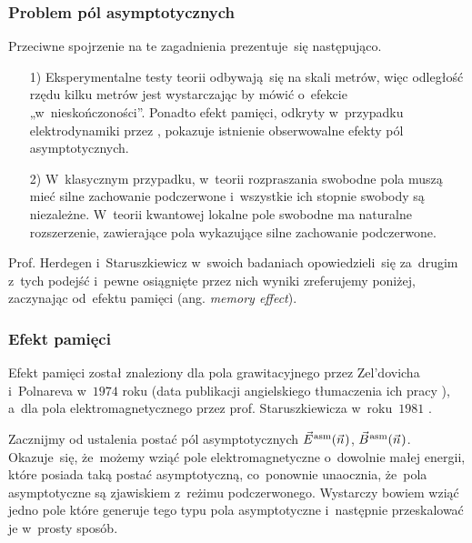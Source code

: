\documentclass[10pt,t]{beamer}
\begin{document}
\begin{frame}
  \frametitle{Problem pól asymptotycznych}


  Przeciwne spojrzenie na te zagadnienia prezentuje~się następująco.

  \begin{itemize}

  \item[1)] Eksperymentalne testy teorii odbywają~się na skali metrów,
    więc odległość rzędu kilku metrów jest wystarczając by mówić o~efekcie
    „w~nieskończoności”. Ponadto efekt pamięci, odkryty w~przypadku
    elektrodynamiki przez
    , pokazuje
    istnienie obserwowalne efekty pól asymptotycznych.

  \item[2)] W~klasycznym przypadku, w~teorii rozpraszania swobodne pola
    muszą mieć silne zachowanie podczerwone i~wszystkie ich stopnie swobody
    są niezależne. W~teorii kwantowej lokalne pole swobodne ma naturalne
    rozszerzenie, zawierające pola wykazujące silne zachowanie podczerwone.

  \end{itemize}

  Prof. Herdegen i~Staruszkiewicz w~swoich badaniach opowiedzieli~się
  za~drugim z~tych podejść i~pewne osiągnięte przez nich wyniki zreferujemy
  poniżej, zaczynając od~efektu pamięci (ang. \textit{memory effect}).

  \end{frame}





\begin{frame}
  \frametitle{Efekt pamięci}


  Efekt pamięci został znaleziony dla pola grawitacyjnego przez
  Zel'dovicha i~Polnareva w~$1974$ roku (data publikacji angielskiego
  tłumaczenia ich pracy
  \parencite{Zeldovich-Polnarev-Radiation-of-gravitational-ETC-Pub-1974}),
  a~dla pola elektromagnetycznego przez prof. Staruszkiewicza w~roku~$1981$
  \parencite{Staruszkiewicz-Gauge-invariant-surface-contribution-ETC-Pub-1981}.

  Zacznijmy od ustalenia postać pól asymptotycznych $\vec{E}^{ \hspace{0.05em} \text{asm} }( \vec{n} \hspace{0.05em} )$,
  $\vec{B}^{ \hspace{0.05em} \text{asm} }( \vec{n} \hspace{0.05em} )$. Okazuje~się, że~możemy wziąć pole elektromagnetyczne
  o~dowolnie małej energii, które posiada taką postać asymptotyczną,
  co~ponownie unaocznia, że~pola asymptotyczne są zjawiskiem z~reżimu
  podczerwonego. Wystarczy bowiem wziąć jedno pole które generuje
  tego typu pola asymptotyczne i~następnie przeskalować je w~prosty sposób.

\end{frame}
\end{document}
